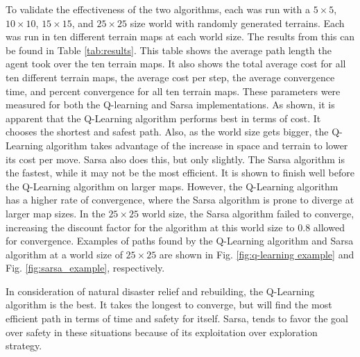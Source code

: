 \documentclass[12pt,american]{report}
\begin{document}
To validate the effectiveness of the two algorithms, each was run with a $5\times  5$, $10\times  10$, $15\times  15$, and $25\times  25$ size world with randomly generated terrains.  Each was run in ten different terrain maps at each world size.  The results from this can be found in Table \ref{tab:results}. This table shows the average path length the agent took over the ten terrain maps. It also shows the total average cost for all ten different terrain maps, the average cost per step, the average convergence time, and percent convergence for all ten terrain maps. These parameters were measured for both the Q-learning and Sarsa implementations.  As shown, it is apparent that the Q-Learning algorithm performs best in terms of cost.  It chooses the shortest and safest path. Also, as the world size gets bigger, the Q-Learning algorithm takes advantage of the increase in space and terrain to lower its cost per move. Sarsa also does this, but only slightly.  The Sarsa algorithm is the fastest, while it may not be the most efficient.  It is shown to finish well before the Q-Learning algorithm on larger maps.  However, the Q-Learning algorithm has a higher rate of convergence, where the Sarsa algorithm is prone to diverge at larger map sizes.  In the $25\times  25$ world size, the Sarsa algorithm failed to converge, increasing the discount factor for the algorithm at this world size to 0.8 allowed for convergence. Examples of paths found by the Q-Learning algorithm and Sarsa algorithm at a world size of $25\times  25$ are shown in Fig. \ref{fig:q-learning example} and Fig. \ref{fig:sarsa_example}, respectively.

In consideration of natural disaster relief and rebuilding, the Q-Learning algorithm is the best.  It takes the longest to converge, but will find the most efficient path in terms of time and safety for itself.  Sarsa, tends to favor the goal over safety in these situations because of its exploitation over exploration strategy. 
\end{document}
